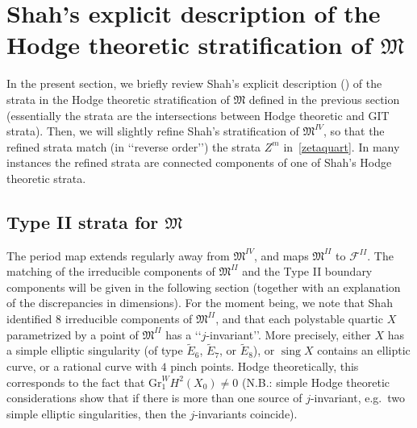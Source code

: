 \documentclass[11pt]{amsart}
\numberwithin{equation}{section}
\theoremstyle{plain}
\theoremstyle{remark}
\theoremstyle{definition}
\newcommand{\cF}{\mathscr{F}}
\newcommand{\Gr}{\mathrm{Gr}}
\newcommand{\gM}{\mathfrak{M}}
\DeclareMathOperator{\sing}{sing}
\begin{document}
%



\section{Shah's explicit description of the Hodge theoretic stratification of $\gM$}\label{sec:refshah}
\setcounter{equation}{0}
%
In the present section, we briefly review Shah's explicit description  (\cite[Theorem 2.4]{shah4}) of the strata in the  Hodge theoretic  stratification of  
$\gM$ defined in the previous section (essentially the strata are the intersections between   Hodge theoretic  and  GIT strata). Then, we will slightly refine Shah's stratification of $\gM^{IV}$,  so that the refined strata  match (in \lq\lq reverse order\rq\rq) the strata $Z^m$  in~\eqref{zetaquart}.  In many instances the refined strata are   connected components of one of Shah's Hodge theoretic strata. 
%
\subsection{Type II strata for $\gM$} 
%
The period map extends regularly away from $\gM^{IV}$, and maps $\gM^{II}$ to $\cF^{II}$.  The matching of the irreducible components of $\gM^{II}$ and the Type II boundary components  will be given in the following section (together with an explanation of the discrepancies in dimensions). For the moment being, we  note that Shah identified $8$  irreducible components of $\gM^{II}$,  and that each polystable quartic $X$ parametrized by a point of $\gM^{II}$ 
has a \lq\lq $j$-invariant\rq\rq. More precisely, either $X$ has  a simple elliptic singularity (of type $\widetilde E_6$, $\widetilde E_7$, or $\widetilde E_8$), or $\sing X$ contains  an elliptic curve, or a rational curve with $4$ pinch points. Hodge theoretically, this corresponds to the fact that $\Gr_1^WH^2(X_0)\neq 0$ (N.B.: simple Hodge theoretic considerations  show that if there is more than one source of $j$-invariant, e.g.~two simple elliptic singularities, then the $j$-invariants  coincide). 
\end{document}
